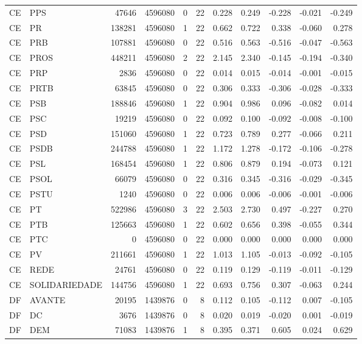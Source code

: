 \begin{landscape}
\begin{longtable}{llrrrrrrrrr}
CE & PPS & 47646 & 4596080 & 0 & 22 & 0.228 & 0.249 & -0.228 & -0.021 & -0.249 \\
CE & PR & 138281 & 4596080 & 1 & 22 & 0.662 & 0.722 & 0.338 & -0.060 & 0.278 \\
CE & PRB & 107881 & 4596080 & 0 & 22 & 0.516 & 0.563 & -0.516 & -0.047 & -0.563 \\
CE & PROS & 448211 & 4596080 & 2 & 22 & 2.145 & 2.340 & -0.145 & -0.194 & -0.340 \\
CE & PRP & 2836 & 4596080 & 0 & 22 & 0.014 & 0.015 & -0.014 & -0.001 & -0.015 \\
CE & PRTB & 63845 & 4596080 & 0 & 22 & 0.306 & 0.333 & -0.306 & -0.028 & -0.333 \\
CE & PSB & 188846 & 4596080 & 1 & 22 & 0.904 & 0.986 & 0.096 & -0.082 & 0.014 \\
CE & PSC & 19219 & 4596080 & 0 & 22 & 0.092 & 0.100 & -0.092 & -0.008 & -0.100 \\
CE & PSD & 151060 & 4596080 & 1 & 22 & 0.723 & 0.789 & 0.277 & -0.066 & 0.211 \\
CE & PSDB & 244788 & 4596080 & 1 & 22 & 1.172 & 1.278 & -0.172 & -0.106 & -0.278 \\
CE & PSL & 168454 & 4596080 & 1 & 22 & 0.806 & 0.879 & 0.194 & -0.073 & 0.121 \\
CE & PSOL & 66079 & 4596080 & 0 & 22 & 0.316 & 0.345 & -0.316 & -0.029 & -0.345 \\
CE & PSTU & 1240 & 4596080 & 0 & 22 & 0.006 & 0.006 & -0.006 & -0.001 & -0.006 \\
CE & PT & 522986 & 4596080 & 3 & 22 & 2.503 & 2.730 & 0.497 & -0.227 & 0.270 \\
CE & PTB & 125663 & 4596080 & 1 & 22 & 0.602 & 0.656 & 0.398 & -0.055 & 0.344 \\
CE & PTC & 0 & 4596080 & 0 & 22 & 0.000 & 0.000 & 0.000 & 0.000 & 0.000 \\
CE & PV & 211661 & 4596080 & 1 & 22 & 1.013 & 1.105 & -0.013 & -0.092 & -0.105 \\
CE & REDE & 24761 & 4596080 & 0 & 22 & 0.119 & 0.129 & -0.119 & -0.011 & -0.129 \\
CE & SOLIDARIEDADE & 144756 & 4596080 & 1 & 22 & 0.693 & 0.756 & 0.307 & -0.063 & 0.244 \\
DF & AVANTE & 20195 & 1439876 & 0 & 8 & 0.112 & 0.105 & -0.112 & 0.007 & -0.105 \\
DF & DC & 3676 & 1439876 & 0 & 8 & 0.020 & 0.019 & -0.020 & 0.001 & -0.019 \\
DF & DEM & 71083 & 1439876 & 1 & 8 & 0.395 & 0.371 & 0.605 & 0.024 & 0.629 \\

\end{longtable}
\end{landscape}
